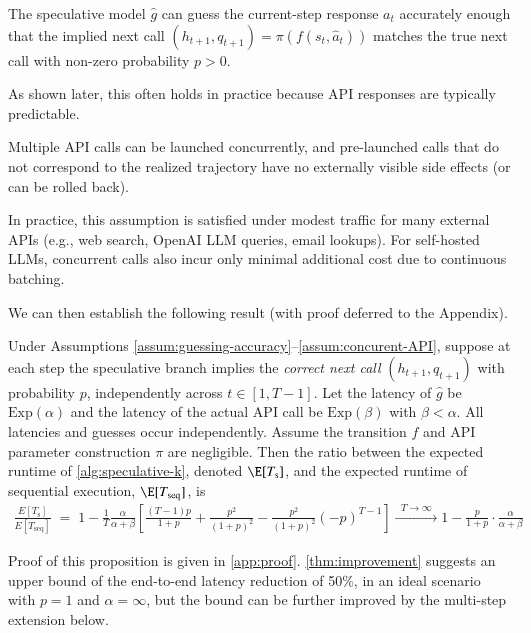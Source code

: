 \begin{assumption}\label{assum:guessing-accuracy}
The speculative model $\hat g$ can guess the current-step response $a_t$ accurately enough that
the implied next call $(h_{t+1},q_{t+1})=\pi(f(s_t,\hat a_t))$ matches the true next call with
non-zero probability $p>0$.
\end{assumption}


As shown later, this often holds in practice because API responses are typically predictable.  

\begin{assumption}\label{assum:concurent-API}
Multiple API calls can be launched concurrently, and pre-launched calls that do not correspond to
the realized trajectory have no externally visible side effects (or can be rolled back).
\end{assumption}


In practice, this assumption is satisfied under modest traffic for many external APIs (e.g., web search, OpenAI LLM queries, email lookups). For self-hosted LLMs, concurrent calls also incur only minimal additional cost due to continuous batching.  

We can then establish the following result (with proof deferred to the Appendix).  


\begin{proposition}
\label{thm:improvement}
Under Assumptions \ref{assum:guessing-accuracy}--\ref{assum:concurent-API}, suppose at each step
the speculative branch implies the \emph{correct next call} $(h_{t+1},q_{t+1})$ with probability $p$, independently across $t\in[1,T-1]$. Let the latency of $\hat{g}$ be $\mathrm{Exp}(\alpha)$ and the latency of the actual API call be $\mathrm{Exp}(\beta)$ with $\beta < \alpha$. All latencies and guesses occur independently. Assume the transition $f$ and API parameter construction $\pi$ are negligible. Then the ratio between the expected runtime of \cref{alg:speculative-k}, denoted $\E[T_{\mathrm{s}}]$, and the expected runtime of sequential execution, $\E[T_{\mathrm{seq}}]$, is
\begin{align*}
    \frac{E[T_{\mathrm{s}}]}{E[T_{\mathrm{seq}}]}
    \;=\;
    1 - \frac{1}{T}\frac{\alpha}{\alpha+\beta}\left[\frac{(T-1)p}{1+p}+\frac{p^2}{(1+p)^2} - \frac{p^2}{(1+p)^2}(-p)^{T-1}\right]
    \xrightarrow{\;\;T\to\infty\;\;}
    1-\frac{p}{1+p}\cdot\frac{\alpha}{\alpha+\beta}
\end{align*}
\end{proposition}
Proof of this proposition is given in \cref{app:proof}. \cref{thm:improvement} suggests an upper bound of the end-to-end latency reduction of 50\%, in an ideal scenario with $p=1$ and $\alpha=\infty$, but the bound can be further improved by the multi-step extension below.  

